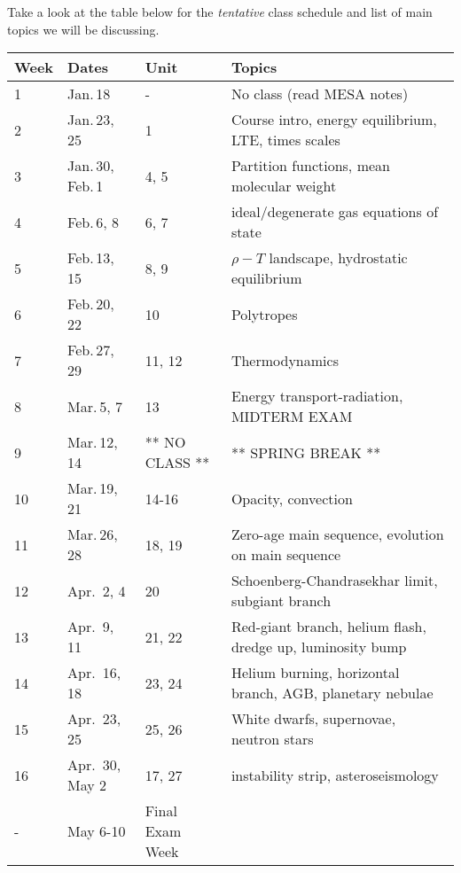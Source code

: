 \documentclass[10pt,letterpaper]{article}
\begin{document}


Take a look at the table below for the \textit{tentative} class schedule and list of main topics we will be discussing.
\begin{table}[h!]
  \sffamily
  \small
  \centering   
  \begin{tabular*}{\textwidth}{@{\extracolsep{\fill}} | l | l | l | l |}
    \hline
    Week & Dates & Unit & Topics \\
    \hline\hline
    1 & Jan.\,18 & - & No class (read MESA notes)\\
    2 & Jan.\,23, 25 & 1  & Course intro, energy equilibrium, LTE, times scales\\ 
    3 & Jan.\,30, Feb.\,1  & 4, 5 & Partition functions, mean molecular weight\\
    4 & Feb.\,6, 8 & 6, 7 & ideal/degenerate gas equations of state \\
    5 & Feb.\,13, 15 & 8, 9 & $\rho-T$ landscape,  hydrostatic equilibrium\\
    6 & Feb.\,20, 22 & 10  & Polytropes\\
    7 & Feb.\,27, 29 & 11, 12 & Thermodynamics \\
    8 & Mar.\,5, 7 & 13 & Energy transport-radiation, MIDTERM EXAM\\
    9 & Mar.\,12, 14 & ** NO CLASS **  & ** SPRING BREAK ** \\
    10 & Mar.\,19, 21 & 14-16 & Opacity, convection\\
    11 & Mar.\,26, 28 & 18, 19  & Zero-age main sequence, evolution on main sequence\\ 
    12 & Apr.\, 2, 4 & 20 & Schoenberg-Chandrasekhar limit, subgiant branch \\
    13 & Apr.\, 9, 11 & 21, 22 &  Red-giant branch, helium flash, dredge up, luminosity bump\\
    14 & Apr.\, 16, 18 & 23, 24 & Helium burning, horizontal branch, AGB, planetary nebulae \\
    15 & Apr.\, 23, 25 & 25, 26 &  White dwarfs, supernovae, neutron stars\\
    16 & Apr.\, 30, May 2 & 17, 27 & instability strip, asteroseismology\\
    - & May 6-10  & Final Exam Week & \\\hline
  \end{tabular*}
\end{table}
\end{document}
